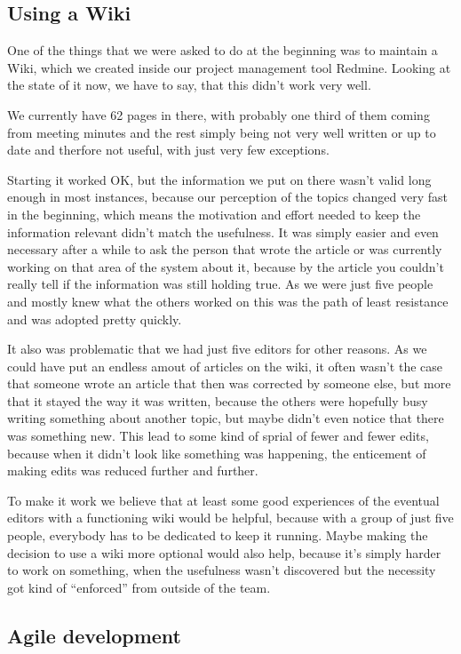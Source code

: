 \subsection{Using a Wiki}

One of the things that we were asked to do at the beginning was to maintain a Wiki, which we created inside our project management tool Redmine. Looking at the state of it now, we have to say, that this didn't work very well. 

We currently have 62 pages in there, with probably one third of them coming from meeting minutes and the rest simply being not very well written or up to date and therfore not useful, with just very few exceptions.

Starting it worked OK, but the information we put on there wasn't valid long enough in most instances, because our perception of the topics changed very fast in the beginning, which means the motivation and effort needed to keep the information relevant didn't match the usefulness. It was simply easier and even necessary after a while to ask the person that wrote the article or was currently working on that area of the system about it, because by the article you couldn't really tell if the information was still holding true. As we were just five people and mostly knew what the others worked on this was the path of least resistance and was adopted pretty quickly.

It also was problematic that we had just five editors for other reasons. As we could have put an endless amout of articles on the wiki, it often wasn't the case that someone wrote an article that then was corrected by someone else, but more that it stayed the way it was written, because the others were hopefully busy writing something about another topic, but maybe didn't even notice that there was something new. This lead to some kind of sprial of fewer and fewer edits, because when it didn't look like something was happening, the enticement of making edits was reduced further and further.

To make it work we believe that at least some good experiences of the eventual editors with a functioning wiki would be helpful, because with a group of just five people, everybody has to be dedicated to keep it running. Maybe making the decision to use a wiki more optional would also help, because it's simply harder to work on something, when the usefulness wasn't discovered but the necessity got kind of \enquote{enforced} from outside of the team.


\subsection{Agile development}

